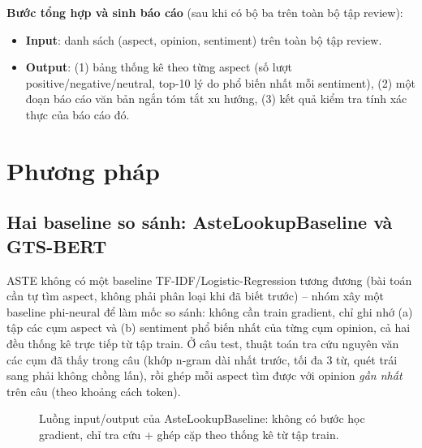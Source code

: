 \documentclass[11pt,a4paper]{article}
\begin{document}
\textbf{Bước tổng hợp và sinh báo cáo} (sau khi có bộ ba trên toàn bộ tập
review):

\begin{itemize}
    \item \textbf{Input}: danh sách (aspect, opinion, sentiment) trên
        toàn bộ tập review.
    \item \textbf{Output}: (1) bảng thống kê theo từng aspect (số lượt
        positive/negative/neutral, top-10 lý do phổ biến nhất mỗi
        sentiment), (2) một đoạn báo cáo văn bản ngắn tóm tắt xu hướng,
        (3) kết quả kiểm tra tính xác thực của báo cáo đó.
\end{itemize}


\clearpage
\section{Phương pháp}
\label{sec:methods}

\subsection{Hai baseline so sánh: AsteLookupBaseline và GTS-BERT}

ASTE không có một baseline TF-IDF/Logistic-Regression tương đương (bài toán
cần tự tìm aspect, không phải phân loại khi đã biết trước) -- nhóm xây một
baseline phi-neural để làm mốc so sánh: không cần train gradient, chỉ ghi
nhớ (a) tập các cụm aspect và (b) sentiment phổ biến nhất của từng cụm
opinion, cả hai đều thống kê trực tiếp từ tập train. Ở câu test, thuật toán
tra cứu nguyên văn các cụm đã thấy trong câu (khớp n-gram dài nhất trước,
tối đa 3 từ, quét trái sang phải không chồng lấn), rồi ghép mỗi aspect tìm
được với opinion \emph{gần nhất} trên câu (theo khoảng cách token).

\begin{figure}[h]
\centering
{}
\caption{Luồng input/output của AsteLookupBaseline: không có bước học
gradient, chỉ tra cứu + ghép cặp theo thống kê từ tập train.}
\end{figure}
\end{document}
